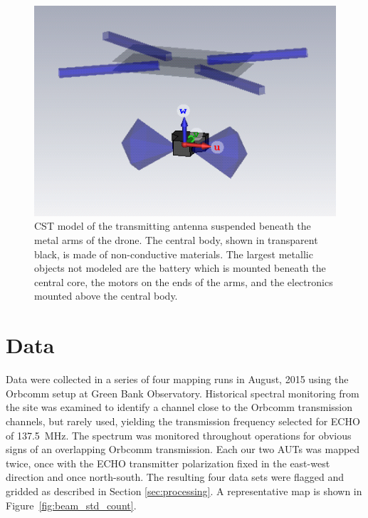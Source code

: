 \documentclass[preprint2,numberedappendix,tighten,twocolappendix]{aastex6}
\begin{document}
\begin{figure}
\includegraphics[width=\columnwidth]{figures/drone_antenna_screenshot.png}
\caption{CST model of the transmitting antenna suspended beneath the metal arms of the drone. The central body, shown in transparent black, is made of non-conductive materials. The largest metallic objects not modeled are the battery which is mounted beneath the central core, the motors on the ends of the arms, and the electronics mounted above the central body.}\label{fig:tx_cst}
\end{figure}




\section{Data}
\label{sec:data}

Data were collected in a series of four mapping runs in August, 2015 using the Orbcomm setup at Green Bank Observatory.   Historical spectral monitoring from the site was examined to identify a channel close to the Orbcomm transmission channels, but rarely used, yielding the transmission frequency selected for ECHO of 137.5~MHz.  The spectrum was monitored throughout operations for obvious signs of an overlapping Orbcomm transmission.  Each our two AUTs was mapped twice, once with the ECHO transmitter polarization fixed in the east-west direction and once north-south.  The resulting four data sets were flagged and gridded as described in Section \ref{sec:processing}.  A representative map is shown in Figure~\ref{fig:beam_std_count}. 


\end{document}

